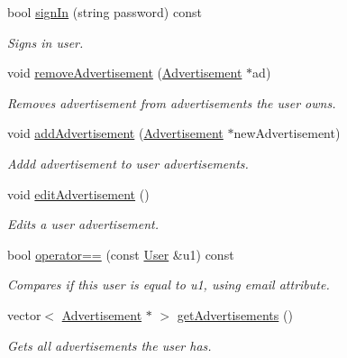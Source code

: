 \begin{DoxyCompactItemize}
bool \hyperlink{class_user_af75d18fdc45ac9fba9911815b78b7daa}{sign\+In} (string password) const 
\begin{DoxyCompactList}\small\item\em Signs in user. \end{DoxyCompactList}\item 
void \hyperlink{class_user_a62c158d18b404de5fa049358c2a64a85}{remove\+Advertisement} (\hyperlink{class_advertisement}{Advertisement} $\ast$ad)
\begin{DoxyCompactList}\small\item\em Removes advertisement from advertisements the user owns. \end{DoxyCompactList}\item 
void \hyperlink{class_user_a7ac881e0b18256f2aa5bc58616994965}{add\+Advertisement} (\hyperlink{class_advertisement}{Advertisement} $\ast$new\+Advertisement)
\begin{DoxyCompactList}\small\item\em Addd advertisement to user advertisements. \end{DoxyCompactList}\item 
\hypertarget{class_user_a7f9f8c64216df27994ffe53960d2d18a}{}void \hyperlink{class_user_a7f9f8c64216df27994ffe53960d2d18a}{edit\+Advertisement} ()\label{class_user_a7f9f8c64216df27994ffe53960d2d18a}

\begin{DoxyCompactList}\small\item\em Edits a user advertisement. \end{DoxyCompactList}\item 
bool \hyperlink{class_user_aa141a81fd5094fea55f53126a94a0342}{operator==} (const \hyperlink{class_user}{User} \&u1) const 
\begin{DoxyCompactList}\small\item\em Compares if this user is equal to u1, using email attribute. \end{DoxyCompactList}\item 
vector$<$ \hyperlink{class_advertisement}{Advertisement} $\ast$ $>$ \hyperlink{class_user_af0392c9bec07c5dae9f267437189ab3b}{get\+Advertisements} ()
\begin{DoxyCompactList}\small\item\em Gets all advertisements the user has. \end{DoxyCompactList}\end{DoxyCompactItemize}
